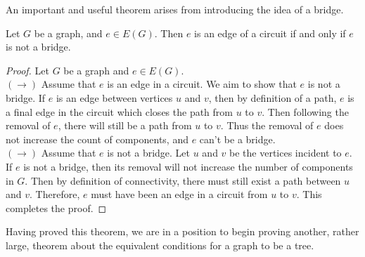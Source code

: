 
An important and useful theorem arises from introducing the idea of a bridge.

\begin{theorem}
Let $G$ be a graph, and $e \in E(G)$. Then $e$ is an edge of a circuit if and only if $e$ is not a bridge.
\end{theorem}
\begin{proof}
Let $G$ be a graph and $e \in E(G)$. \\
$(\rightarrow)$ Assume that $e$ is an edge in a circuit. We aim to show that $e$ is not a bridge. If $e$ is an edge between vertices $u$ and $v$, then by definition of a path, $e$ is a final edge in the circuit which closes the path from $u$ to $v$. Then following the removal of $e$, there will still be a path from $u$ to $v$. Thus the removal of $e$ does not increase the count of components, and $e$ can't be a bridge. \\
$(\rightarrow)$ Assume that $e$ is not a bridge. Let $u$ and $v$ be the vertices incident to $e$. If $e$ is not a bridge, then its removal will not increase the number of components in $G$. Then by definition of connectivity, there must still exist a path between $u$ and $v$. Therefore, $e$ must have been an edge in a circuit from $u$ to $v$. This completes the proof.
\end{proof}

Having proved this theorem, we are in a position to begin proving another, rather large, theorem about the equivalent conditions for a graph to be a tree.

